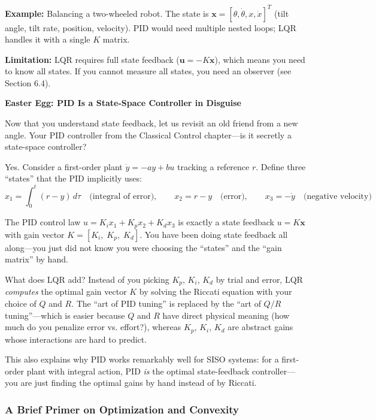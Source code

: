 \textbf{Example:} Balancing a two-wheeled robot. The state is $\mathbf{x} = [\theta, \dot{\theta}, x, \dot{x}]^T$ (tilt angle, tilt rate, position, velocity). PID would need multiple nested loops; LQR handles it with a single $K$ matrix.

\textbf{Limitation:} LQR requires full state feedback ($\mathbf{u} = -K\mathbf{x}$), which means you need to know all states. If you cannot measure all states, you need an observer (see Section 6.4).

\vspace{0.5em}
\begin{mdframed}[linewidth=1pt, innertopmargin=10pt, innerbottommargin=10pt]
\textbf{Easter Egg: PID Is a State-Space Controller in Disguise}

\vspace{0.3em}
Now that you understand state feedback, let us revisit an old friend from a new angle. Your PID controller from the Classical Control chapter---is it secretly a state-space controller?

Yes. Consider a first-order plant $\dot{y} = -ay + bu$ tracking a reference $r$. Define three ``states'' that the PID implicitly uses:
\[
x_1 = \int_0^t (r - y)\,d\tau \quad \text{(integral of error)}, \qquad
x_2 = r - y \quad \text{(error)}, \qquad
x_3 = -\dot{y} \quad \text{(negative velocity)}
\]

The PID control law $u = K_i x_1 + K_p x_2 + K_d x_3$ is exactly a state feedback $u = K \mathbf{x}$ with gain vector $K = [K_i, \; K_p, \; K_d]$. You have been doing state feedback all along---you just did not know you were choosing the ``states'' and the ``gain matrix'' by hand.

What does LQR add? Instead of you picking $K_p$, $K_i$, $K_d$ by trial and error, LQR \textit{computes} the optimal gain vector $K$ by solving the Riccati equation with your choice of $Q$ and $R$. The ``art of PID tuning'' is replaced by the ``art of $Q/R$ tuning''---which is easier because $Q$ and $R$ have direct physical meaning (how much do you penalize error vs. effort?), whereas $K_p$, $K_i$, $K_d$ are abstract gains whose interactions are hard to predict.

This also explains why PID works remarkably well for SISO systems: for a first-order plant with integral action, PID \textit{is} the optimal state-feedback controller---you are just finding the optimal gains by hand instead of by Riccati.
\end{mdframed}

\subsubsection{A Brief Primer on Optimization and Convexity}

